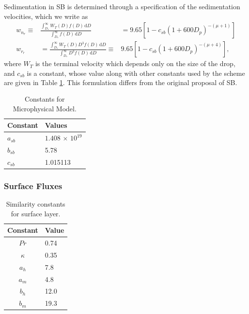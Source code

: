 \documentclass[11pt,a4paper]{article}
\begin{document}
Sedimentation in SB is determined through a specification of the
sedimentation velocities, which we write as
\begin{eqnarray}
w_{n_r} \equiv & \frac{\int_{D_*}^\infty W_T(D) f(D) \,
\mathrm{d}D}{\int_{D_*}^\infty f(D) \, \mathrm{d}D} & = 9.65\left[1 -
c_{sb}\left(1+600 D_p\right)^{-(\mu+1)} \right] \label{eq:wn} \\
w_{r_r} & = \frac{\int_{D_*}^\infty W_T(D) D^3 f(D) \,
\mathrm{d}D}{\int_{D_*}^\infty D^3 f(D) \, \mathrm{d}D} \equiv &
9.65\left[1 - c_{sb}\left(1 + 600 D_p \right)^{-(\mu+4)} \right],
\label{eq:wr}
\end{eqnarray}
where $W_T$ is the terminal velocity which depends only on the size of
the drop, and $c_{sb}$ is a constant, whose value along with other
constants used by the scheme are given in Table \ref{tbl:SB}.  This
formulation differs from the original proposal of SB.

\begin{table}[htb]
\begin{center}
\caption{Constants for Microphysical Model. \label{tbl:SB}}
\begin{tabular}{ll} \hline \hline
Constant  & Values \\ \hline
$a_{sb}$  & $1.408 \, \times \, 10^{19}$ \\
$b_{sb}$  & 5.78 \\
$c_{sb}$  & 1.015113 \\ 
\end{tabular}
\end{center}
\end{table}

\subsubsection{Surface Fluxes}  

\begin{table}[htb]
\caption{Similarity constants for surface layer.} \label{tbl:surface}
\begin{center}
\begin{tabular}{cl} \hline \hline
Constant & Value  \\ \hline
$Pr$       & 0.74 \\
$\kappa$   & 0.35 \\
$a_h$      & 7.8  \\
$a_m$      & 4.8  \\
$b_h$      & 12.0 \\
$b_m$      & 19.3 \\ \hline
\end{tabular}
\end{center}
\end{table}
\end{document}

